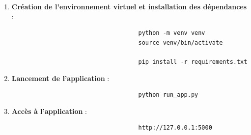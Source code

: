 \documentclass[a4paper,11pt]{article}
\begin{document}
                    \begin{enumerate}
                        \item \textbf{Création de l'environnement virtuel et installation des dépendances} :
                            \begin{tcolorbox}[colback=lightgray!6, colframe=black, left=-60mm, right=5mm, top=2mm, bottom=0mm, boxrule=0.1mm]
                                \begin{verbatim}
                                    python -m venv venv
                                    source venv/bin/activate

                                    pip install -r requirements.txt
                                \end{verbatim}
                            \end{tcolorbox}

                        \item \textbf{Lancement de l'application} :
                            \begin{tcolorbox}[colback=lightgray!6, colframe=black, left=-60mm, right=5mm, top=2mm, bottom=0mm, boxrule=0.1mm]
                                \begin{verbatim}
                                    python run_app.py
                                \end{verbatim}
                            \end{tcolorbox}

                        \item \textbf{Accès à l'application} :
                            \begin{tcolorbox}[colback=lightgray!6, colframe=black, left=-60mm, right=5mm, top=2mm, bottom=0mm, boxrule=0.1mm]
                                \begin{verbatim}
                                    http://127.0.0.1:5000
                                \end{verbatim}
                            \end{tcolorbox}


\end{enumerate}
\end{document}

